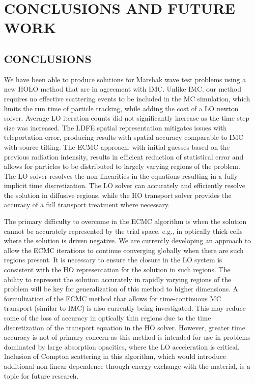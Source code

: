 \chapter{ \uppercase{Conclusions and Future Work} }


\section{CONCLUSIONS}

We have been able to produce solutions for Marshak wave test problems using
a new HOLO method that are in agreement with IMC.  Unlike IMC, our method requires no effective scattering
events to be included in the MC simulation, which limits the run time of particle
tracking, while adding the cost of a LO newton solver. Average LO iteration counts
did not significantly increase as the time step size was increased. The LDFE spatial representation
mitigates issues with teleportation error, producing results with spatial accuracy
comparable to IMC with source tilting.  The ECMC approach, with initial guesses based on the
previous radiation intensity, results in efficient reduction of statistical error and
allows for particles to be distributed to largely varying regions of the problem.
The LO solver resolves the non-linearities in the equations resulting in a fully
implicit time discretization.
The LO solver
can accurately and efficiently resolve the solution in diffusive regions, while the HO
transport solver provides the accuracy of a full transport treatment where necessary. 

The primary difficulty to overcome in the ECMC algorithm is when the solution cannot
be accurately represented by the trial space, e.g., in optically thick cells where
the solution is driven negative.   We are currently developing an approach to allow
the ECMC iterations to continue converging globally when there are such regions
present.  It is necessary to ensure the
 closure in the LO system is consistent with the HO
representation for the solution in such regions.  The ability to represent the solution accurately in
rapidly varying regions of the problem will be key for generalization of this method
to higher dimensions.  A formulization of the ECMC method
that allows for time-continuous MC transport (similar to IMC) is also currently being
investigated.  This may reduce some of the loss of accuracy in optically thin regions
due to the time discretization of the transport equation in the HO solver.
However, greater time accuracy is not of primary concern as this method is intended
for use in problems dominated by large absorption opacities, where the LO
acceleration is critical. Inclusion of Compton scattering in this algorithm, which would introduce
additional non-linear dependence through energy exchange with the
material, is a topic for future research.


